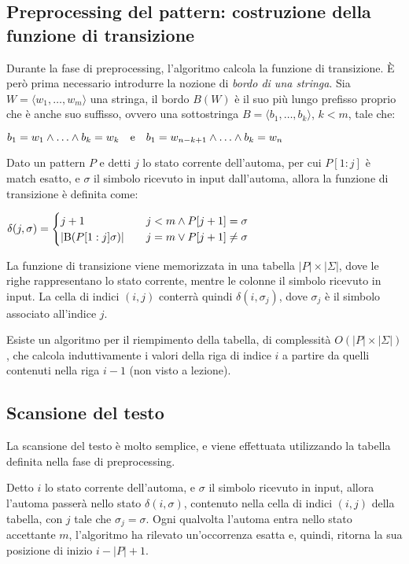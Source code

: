 \subsection*{Preprocessing del pattern: costruzione della funzione di transizione}
Durante la fase di preprocessing, l'algoritmo calcola la funzione di transizione.
È però prima necessario introdurre la nozione di \textit{bordo di una stringa}. Sia $W = \langle w_1, \ldots, w_m \rangle$ una stringa, il bordo $B(W)$ è il suo più lungo prefisso proprio che è anche suo suffisso, ovvero una sottostringa $B = \langle b_1, \ldots, b_k \rangle$, $k < m$, tale che:
\begin{center}
    $b_1 = w_1 \land \ldots \land b_k = w_k \quad \textnormal{e} \quad b_1 = w_{n-k+1} \land \ldots \land b_k = w_n$
\end{center}
Dato un pattern $P$ e detti $j$ lo stato corrente dell'automa, per cui $P[1:j]$ è match esatto, e $\sigma$ il simbolo ricevuto in input dall'automa, allora la funzione di transizione è definita come:
\begin{center}
    $\delta (j, \sigma) = \begin{cases}
        j+1 & \quad j < m \land P[j+1] = \sigma \\
        \vert \textnormal{B}(P[1:j]\sigma) \vert & \quad j = m \lor P[j+1] \neq \sigma
    \end{cases}$
\end{center}
La funzione di transizione viene memorizzata in una tabella $|P| \times |\Sigma|$, dove le righe rappresentano lo stato corrente, mentre le colonne il simbolo ricevuto in input.
La cella di indici $(i, j)$ conterrà quindi $\delta (i, \sigma_j)$, dove $\sigma_j$ è il simbolo associato all'indice $j$.

Esiste un algoritmo per il riempimento della tabella, di complessità $O(|P| \times |\Sigma|)$, che calcola induttivamente i valori della riga di indice $i$ a partire da quelli contenuti nella riga $i-1$ (non visto a lezione).

\subsection*{Scansione del testo}
La scansione del testo è molto semplice, e viene effettuata utilizzando la tabella definita nella fase di preprocessing.

Detto $i$ lo stato corrente dell'automa, e $\sigma$ il simbolo ricevuto in input, allora l'automa passerà nello stato $\delta (i, \sigma)$, contenuto nella cella di indici $(i, j)$ della tabella, con $j$ tale che $\sigma_j = \sigma$.
Ogni qualvolta l'automa entra nello stato accettante $m$, l'algoritmo ha rilevato un'occorrenza esatta e, quindi, ritorna la sua posizione di inizio $i - |P| + 1$.

